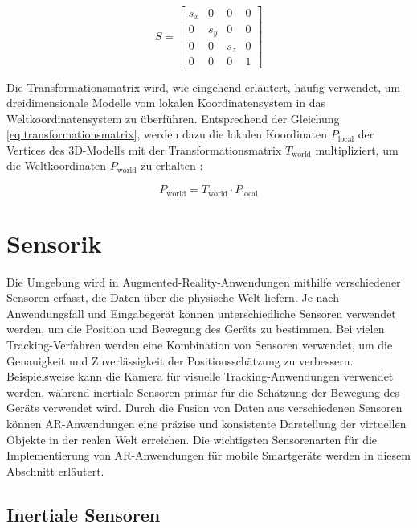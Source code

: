 \begin{equation}
    S = 
    \begin{bmatrix} 
        s_x & 0 & 0 & 0 \\ 
        0 & s_y & 0 & 0 \\ 
        0 & 0 & s_z & 0 \\ 
        0 & 0 & 0 & 1 
    \end{bmatrix}
\end{equation}

Die Transformationsmatrix wird, wie eingehend erläutert, häufig verwendet, um dreidimensionale Modelle vom lokalen Koordinatensystem in das Weltkoordinatensystem zu überführen. Entsprechend der Gleichung \ref{eq:transformationsmatrix}, werden dazu die lokalen Koordinaten \( P_{\text{local}} \) der Vertices des 3D-Modells mit der Transformationsmatrix \( T_{\text{world}} \) multipliziert, um die Weltkoordinaten \( P_{\text{world}} \) zu erhalten \cite{doerner2022virtual, gao2021vSLAM, freescale2010math3d}:

\begin{equation}
    P_{\text{world}} = T_{\text{world}} \cdot P_{\text{local}}
\end{equation}

\section{Sensorik}

Die Umgebung wird in Augmented-Reality-Anwendungen mithilfe verschiedener Sensoren erfasst, die Daten über die physische Welt liefern. Je nach Anwendungsfall und Eingabegerät können unterschiedliche Sensoren verwendet werden, um die Position und Bewegung des Geräts zu bestimmen. Bei vielen Tracking-Verfahren werden eine Kombination von Sensoren verwendet, um die Genauigkeit und Zuverlässigkeit der Positionsschätzung zu verbessern. Beispielsweise kann die Kamera für visuelle Tracking-Anwendungen verwendet werden, während inertiale Sensoren primär für die Schätzung der Bewegung des Geräts verwendet wird. Durch die Fusion von Daten aus verschiedenen Sensoren können AR-Anwendungen eine präzise und konsistente Darstellung der virtuellen Objekte in der realen Welt erreichen. Die wichtigsten Sensorenarten für die Implementierung von AR-Anwendungen für mobile Smartgeräte werden in diesem Abschnitt erläutert. \cite{doerner2022virtual}

\subsection{Inertiale Sensoren}

